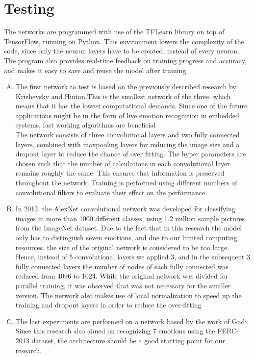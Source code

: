 \section{Testing}
The networks are programmed with use of the TFLearn library on top of TensorFlow, running on Python. This environment lowers the complexity of the code, since only the neuron layers have to be created, instead of every neuron. The program also provides real-time feedback on training progress and accuracy, and makes it easy to save and reuse the model after training.
\begin{enumerate}[(A)]
	\item  The first network to test is based on the previously described research by Krizhevsky and Hinton.This is the smallest network of the three, which means that it has the lowest computational demands. Since one of the future applications might be in the form of live emotion recognition in embedded systems, fast working algorithms are beneficial\\
	The network consists of three convolutional layers and two fully connected layers, combined with maxpooling layers for reducing the image size and a dropout layer to reduce the chance of over fitting. The hyper parameters are chosen such that the number of calculations in each convolutional layer remains roughly the same. This ensures that information is preserved throughout the network. Training is performed using different numbers of convolutional filters to evaluate their effect on the performance.
	\item In 2012, the AlexNet convolutional network was developed for classifying images in more than 1000 different classes, using 1.2 million sample pictures from the ImageNet dataset. Due to the fact that in this research the model only has to distinguish seven emotions, and due to our limited computing resources, the size of the original network is considered to be too large.\\
	Hence, instead of 5 convolutional layers we applied 3, and in the subsequent 3 fully connected layers the number of nodes of each fully connected was reduced from 4096 to 1024. While the original network was divided for parallel training, it was observed that was not necessary for the smaller version. The network also makes use of local normalization to speed up the training and dropout layers in order to reduce the over-fitting
	\item  The last experiments are performed on a network based by the work of Gudi. Since this research also aimed on recognizing 7 emotions using the FERC-2013 dataset, the architecture should be a good starting point for our research.

\end{enumerate}
